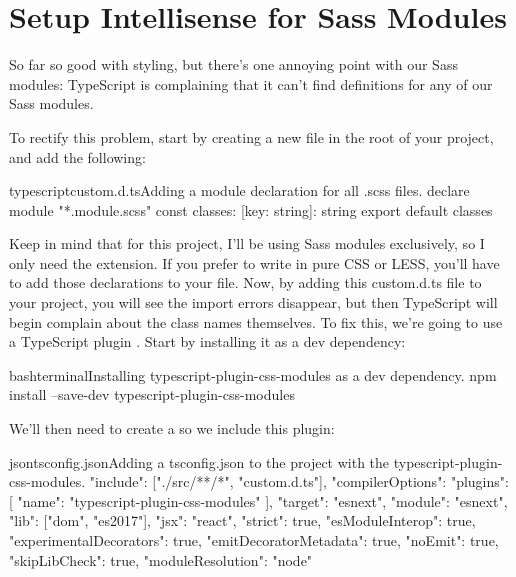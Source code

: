\documentclass[a4paper,headinclude=on,footinclude=on,12pt,oneside]{scrbook}
\begin{document}
\section{Setup Intellisense for Sass Modules}

So far so good with styling, but there's one annoying point with our Sass modules: TypeScript is complaining that it can't find definitions for any of our Sass modules. 


To rectify this problem, start by creating a new file  in the root of your project, and add the following:

\begin{codeInput}{typescript}{custom.d.ts}{Adding a module declaration for all .scss files.}
declare module "*.module.scss" {
  const classes: { [key: string]: string }
  export default classes
}  
\end{codeInput}

Keep in mind that for this project, I'll be using Sass modules exclusively, so I only need the  extension. If you prefer to write in pure CSS or LESS, you'll have to add those declarations to your  file. Now, by adding this custom.d.ts file to your project, you will see the import errors disappear, but then TypeScript will begin complain about the class names themselves. To fix this, we're going to use a TypeScript plugin . Start by installing it as a dev dependency:

\begin{codeInput}{bash}{terminal}{Installing typescript-plugin-css-modules as a dev dependency.}
npm install --save-dev typescript-plugin-css-modules
\end{codeInput}

We'll then need to create a  so we include this plugin:

\begin{codeInput}{json}{tsconfig.json}{Adding a tsconfig.json to the project with the typescript-plugin-css-modules.}
{
  "include": ["./src/**/*", "custom.d.ts"],
  "compilerOptions": {
    "plugins": [{ "name": "typescript-plugin-css-modules" }],
    "target": "esnext",
    "module": "esnext",
    "lib": ["dom", "es2017"],
    "jsx": "react",
    "strict": true,
    "esModuleInterop": true,
    "experimentalDecorators": true,
    "emitDecoratorMetadata": true,
    "noEmit": true,
    "skipLibCheck": true,
    "moduleResolution": "node"
  }
}
\end{codeInput}
\end{document}
